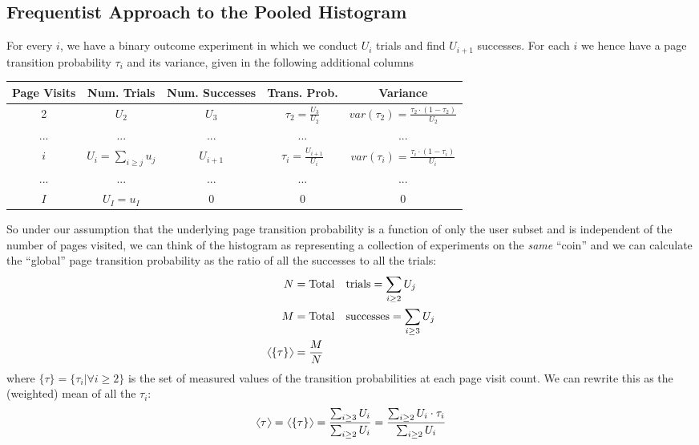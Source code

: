 \documentclass[12pt]{report}
\newcommand{\beq}{\begin{equation}} %
\newcommand{\eeq}{\end{equation}} %
\newcommand{\bdm}{\begin{displaymath}} %
\newcommand{\edm}{\end{displaymath}} %
\newcommand{\langl}{\begin{picture}(4.5,7)
\put(1.1,2.5){\rotatebox{60}{\line(1,0){5.5}}}
\put(1.1,2.5){\rotatebox{300}{\line(1,0){5.5}}}
\end{picture}}
\newcommand{\rangl}{\begin{picture}(4.5,7)
\put(.9,2.5){\rotatebox{120}{\line(1,0){5.5}}}
\put(.9,2.5){\rotatebox{240}{\line(1,0){5.5}}}
\end{picture}}
\newcommand{\mymean}[1]{\ensuremath{\langl{#1}\rangl}} %
\newcommand{\histtau}{\{\tau\}}
\begin{document}
\subsection{Frequentist Approach to the Pooled Histogram}\label{sec:freqpooled}
For every \(i\), we have a binary outcome experiment in which we
conduct \(U_i\) trials and find \(U_{i+1}\) successes. For each \(i\)
we hence have a page transition probability \(\tau_i\) and its
variance, given in the following additional columns
\begin{center}\label{table:tau}
\begin{tabular}{ |c|c|c|c|c| } 
 \hline
 Page Visits & Num. Trials & Num. Successes & Trans. Prob. & Variance \\
 \hline
 2 & \(U_2\) & \(U_3\) & \(\tau_2 = \frac{U_3}{U_2}\) & \(var(\tau_2) = \frac{\tau_2\cdot(1-\tau_2)}{U_2}\) \\
 ... & ... & ... & ... & ... \\ 
 \(i\) & \(U_i = \sum_{i\ge j}u_j\) & \(U_{i+1}\) & \(\tau_i = \frac{U_{i+1}}{U_i}\) & \(var(\tau_i) = \frac{\tau_i\cdot(1-\tau_i)}{U_i}\) \\ 
 ... & ... & ... & ... & ... \\
 \(I\) & \(U_I = u_I\) & 0 & 0 & 0 \\
 \hline
\end{tabular}
\end{center}
So under our assumption that the underlying page transition
probability is a function of only the user subset and is independent
of the number of pages visited, we can think of the histogram as
representing a collection of experiments on the {\em same} ``coin''
and we can calculate the ``global'' page transition probability as the
ratio of all the successes to all the trials:
\beq
\begin{split}
  N &= {\rm Total\quad trials} = \sum_{i\ge 2}U_j\\ 
  M &= {\rm Total\quad successes} = \sum_{i\ge 3}U_j\\
  \mymean{\histtau} &= \frac{M}{N}
\end{split}
\eeq
where \(\histtau=\{\tau_i|\forall i\ge 2\}\) is the set of measured values
of the transition probabilities at each page visit count.
We can rewrite this as the
  (weighted) mean of all the \(\tau_i\):
\bdm\label{eq:meantau}
\mymean{\tau}= \mymean{\histtau} = \frac{\sum_{i\ge 3}U_i}{\sum_{i\ge 2}U_i} = \frac{\sum_{i\ge 2}U_i\cdot \tau_i}{\sum_{i\ge 2}U_i} 
\edm
\end{document}
